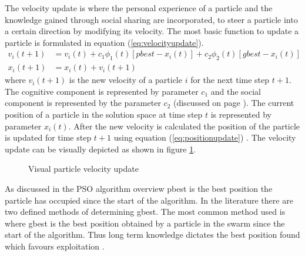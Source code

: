 The velocity update is where the personal experience of a particle and the knowledge gained through social sharing are incorporated, to steer a particle into a certain direction by modifying its velocity. The most basic function to update a particle is formulated in equation (\ref{eq:velocityupdate}).
\begin{align}
v_i(t+1) &= v_i(t) + c_1\phi_{1}(t)[pbest - x_i(t)] + c_2\phi_{2}(t)[gbest - x_i(t)]\label{eq:velocityupdate}\\
x_i(t+1) &= x_i(t) + v_i(t+1)\label{eq:positionupdate}
\end{align}
where $v_i(t+1)$ is the new velocity of a particle $i$ for the next time step $t+1$. The cognitive component is represented by parameter $c_1$ and the social component is represented by the parameter $c_2$ (discussed on page \pageref{def:cognitivecomponent}). The current position of a particle in the solution space at time step $t$ is represented by parameter $x_i(t)$. After the new velocity is calculated the position of the particle is updated for time step $t+1$ using equation (\ref{eq:positionupdate}) \cite{FundamentalSwarm,CompuIntelligenceIntro}. The velocity update can be visually depicted as shown in figure \ref{fig:particleVelocityUpdate}. 
\begin{figure}[h]
	\centering
	\setlength \fboxsep{0pt}
	\setlength \fboxrule{0.5pt}
	\caption{Visual particle velocity update \cite{SOSwarm,FundamentalSwarm,CompuIntelligenceIntro,PSOSelfHierarch}}

	\label{fig:particleVelocityUpdate}
\end{figure}

As discussed in the PSO algorithm overview pbest is the best position the particle has occupied since the start of the algorithm. In the literature there are two defined methods of determining gbest. The most common method used is where gbest is the best position obtained by a particle in the swarm since the start of the algorithm. Thus long term knowledge dictates the best position found which favours exploitation \cite{CompuIntelligenceIntro,FundamentalSwarm}.

